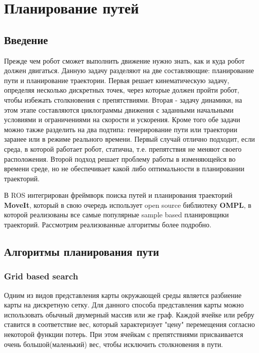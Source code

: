 \chapter{Планирование путей} \label{chapt1}


\section{Введение} \label{sect1_1}
Прежде чем робот сможет выполнить движение нужно знать, как и куда робот должен двигаться. Данную задачу разделяют на две составляющие: планирование пути и планирование траектории. Первая решает кинематическую задачу, определяя несколько дискретных точек, через которые должен пройти робот, чтобы избежать столкновения с препятствиями. Вторая - задачу динамики, на этом этапе составляются циклограммы движения с заданными начальными условиями и ограничениями на скорости и ускорения. Кроме того обе задачи можно также разделить на два подтипа: генерирование пути или траектории заранее или в режиме реального времени. Первый случай отлично подходит, если среда, в которой работает робот, статична, т.е. препятствия не меняют своего расположения. Второй подход решает проблему работы в изменяющейся во времени среде, но не обеспечивает какой либо оптимальности в планировании траекторий.

В ROS интегрирован фреймворк поиска путей и планирования траекторий \textbf{MoveIt}, который в свою очередь использует open source библиотеку \textbf{OMPL}, в которой реализованы все самые популярные sample based планировщики траекторий. Рассмотрим реализованные алгоритмы более подробно.

\section{Алгоритмы планирования пути} \label{sect1_2}
\subsection{Grid based search}\label{subsect1_2_1}
Одним из видов представления карты окружающей среды является разбиение карты на дискретную сетку. Для данного способа представления карты можно использовать обычный двумерный массив или же граф. Каждой ячейке или ребру ставится в соответствие вес, который характеризует "цену" перемещения согласно некоторой функции потерь. При этом ячейкам с препятствиями присваивается очень большой(маленький) вес, чтобы исключить столкновения в пути.

